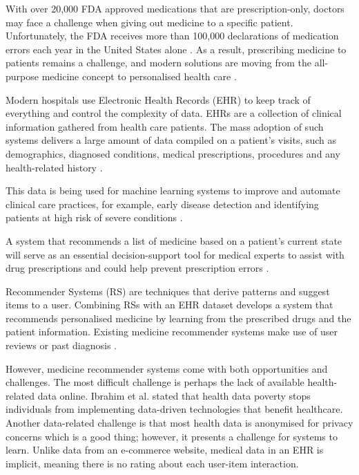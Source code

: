 With over 20,000 FDA approved medications that are prescription-only,
doctors may face a challenge when giving out medicine to a specific
patient. Unfortunately, the FDA receives more than 100,000 declarations
of medication errors each year in the United States alone \cite{FDA2021}.
As a result, prescribing medicine to patients remains a challenge, and
modern solutions are moving from the all-purpose medicine concept to
personalised health care \cite{Bhoi2021}.

Modern hospitals use Electronic Health Records (EHR) to keep track of
everything and control the complexity of data. EHRs are a collection of
clinical information gathered from health care patients. The mass
adoption of such systems delivers a large amount of data compiled on a
patient's visits, such as demographics, diagnosed conditions, medical
prescriptions, procedures and any health-related history \cite{Kim2019}.

This data is being used for machine learning systems to improve and
automate clinical care practices, for example, early disease detection
and identifying patients at high risk of severe conditions
\cite{10.2307/20720782, Juhn2019}.

A system that recommends a list of medicine based on a patient's current
state will serve as an essential decision-support tool for medical
experts to assist with drug prescriptions and could help prevent
prescription errors \cite{Jamshidi2018}. 

Recommender Systems (RS) are techniques that derive patterns and suggest
items to a user\cite{Ricci2011}. Combining RSs with an EHR dataset develops 
a system that recommends personalised medicine by learning from
the prescribed drugs and the patient information. Existing medicine
recommender systems make use of user reviews or past
diagnosis \cite{Bhoi2021, Rao2020}.

However, medicine recommender systems come with both opportunities and
challenges. The most difficult challenge is perhaps the lack of available
health-related data online. Ibrahim et al. \cite{Ferner2000} stated that
health data poverty stops individuals from implementing data-driven
technologies that benefit healthcare. Another data-related challenge is
that most health data is anonymised for privacy concerns which is a good
thing; however, it presents a challenge for systems to learn. Unlike data
from an e-commerce website, medical data in an EHR is implicit, meaning
there is no rating about each user-item interaction.


